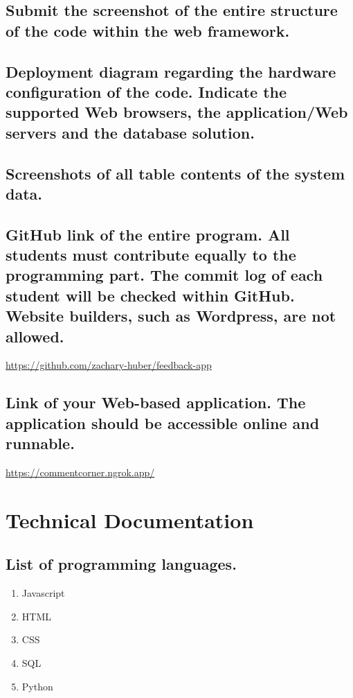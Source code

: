 \documentclass[letterpaper, 12 pt, conference]{ieeeconf}
\begin{document}
\subsection{Submit the screenshot of the entire structure of the code within the web framework.}
\linebreak
    \hfill \break
    
\subsection{Deployment diagram regarding the hardware configuration of the code. Indicate the supported Web browsers, the application/Web servers and the database solution.}
\linebreak
    \hfill \break
    
\subsection{Screenshots of all table contents of the system data.}
\linebreak
    \hfill \break
    
\subsection{GitHub link of the entire program. All students must contribute equally to the programming part. The commit log of each student will be checked within GitHub. Website builders, such as Wordpress, are not allowed.}
\linebreak
\url{https://github.com/zachary-huber/feedback-app}
\hfill \break

\subsection{Link of your Web-based application. The application should be accessible online and runnable.}
\linebreak
\url{https://commentcorner.ngrok.app/}
\hfill \break

\newpage

\section{Technical Documentation}
\subsection{List of programming languages.}
\begin{enumerate}
   \item Javascript
   \item HTML
   \item CSS
   \item SQL
   \item Python
\end{enumerate}
\hfill
\newline
\end{document}
